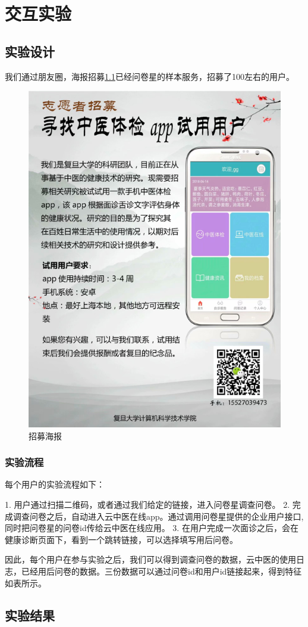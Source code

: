 \chapter{交互实验}


\section{实验设计}
我们通过朋友圈，海报招募\ref{fig:poster}已经问卷星的样本服务，招募了100左右的用户。
\begin{figure}
    \centering
    \includegraphics{images/poster.png}
    \caption{招募海报}
    \label{fig:poster}
\end{figure}
\subsection{实验流程}
每个用户的实验流程如下：

1. 用户通过扫描二维码，或者通过我们给定的链接，进入问卷星调查问卷。
2. 完成调查问卷之后，自动进入云中医在线app。通过调用问卷星提供的企业用户接口, 同时把问卷星的问卷id传给云中医在线应用。
3. 在用户完成一次面诊之后，会在健康诊断页面下，看到一个跳转链接，可以选择填写用后问卷。

因此，每个用户在参与实验之后，我们可以得到调查问卷的数据，云中医的使用日志，已经用后问卷的数据。三份数据可以通过问卷id和用户id链接起来，得到特征如表所示。




\section{实验结果}




